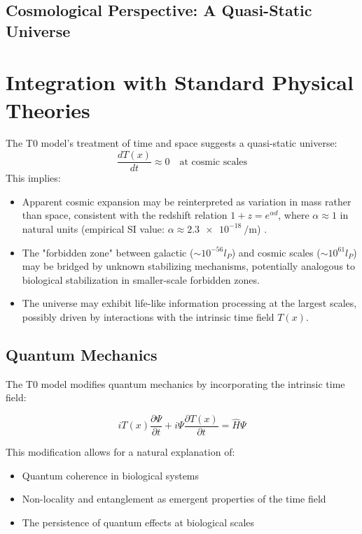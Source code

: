 \documentclass[12pt,a4paper]{article}
\newcommand{\Tfield}{T(x)}
\begin{document}
	\subsection{Cosmological Perspective: A Quasi-Static Universe}
	\label{subsec:cosmological_perspective}
	
	
	\section{Integration with Standard Physical Theories}
	\label{sec:integration}
The T0 model's treatment of time and space suggests a quasi-static universe:
\begin{equation}
	\frac{d\Tfield}{dt} \approx 0 \quad \text{at cosmic scales}
\end{equation}
This implies:
\begin{itemize}
	\item Apparent cosmic expansion may be reinterpreted as variation in mass rather than space, consistent with the redshift relation \(1 + z = e^{\alpha d}\), where \(\alpha \approx 1\) in natural units (empirical SI value: \(\alpha \approx \SI{2.3e-18}{\per\meter}\)) \cite{pascher_messdifferenzen_2025}.
	\item The "forbidden zone" between galactic (\(\sim 10^{-56} l_P\)) and cosmic scales (\(\sim 10^{61} l_P\)) may be bridged by unknown stabilizing mechanisms, potentially analogous to biological stabilization in smaller-scale forbidden zones.
	\item The universe may exhibit life-like information processing at the largest scales, possibly driven by interactions with the intrinsic time field \(\Tfield\).
\end{itemize}
	\subsection{Quantum Mechanics}
	\label{subsec:quantum_integration}
	
	The T0 model modifies quantum mechanics by incorporating the intrinsic time field:
	
	\begin{equation}
		i\Tfield\frac{\partial \Psi}{\partial t} + i\Psi\frac{\partial \Tfield}{\partial t} = \hat{H}\Psi
	\end{equation}
	
	This modification allows for a natural explanation of:
	
	\begin{itemize}
		\item Quantum coherence in biological systems
		\item Non-locality and entanglement as emergent properties of the time field
		\item The persistence of quantum effects at biological scales
	\end{itemize}
	
\end{document}
